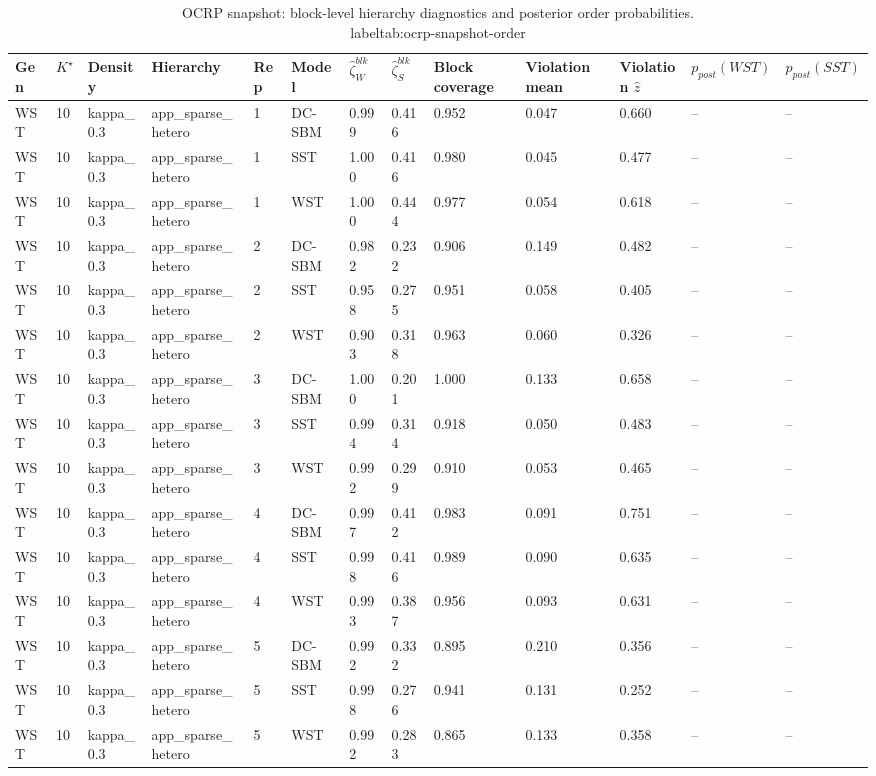 \begin{table}[!h]
\centering
\caption{OCRP snapshot: block-level hierarchy diagnostics and posterior order probabilities.\\label{tab:ocrp-snapshot-order}}
\centering
\begin{tabular}[t]{lllllllllllll}
\toprule
Gen & $K^\star$ & Density & Hierarchy & Rep & Model & $\widehat\zeta_W^{blk}$ & $\widehat\zeta_S^{blk}$ & Block coverage & Violation mean & Violation $\hat z$ & $p_{post}(WST)$ & $p_{post}(SST)$\\
\midrule
WST & 10 & kappa_0.3 & app_sparse_hetero & 1 & DC-SBM & 0.999 & 0.416 & 0.952 & 0.047 & 0.660 & -- & --\\
WST & 10 & kappa_0.3 & app_sparse_hetero & 1 & SST & 1.000 & 0.416 & 0.980 & 0.045 & 0.477 & -- & --\\
WST & 10 & kappa_0.3 & app_sparse_hetero & 1 & WST & 1.000 & 0.444 & 0.977 & 0.054 & 0.618 & -- & --\\
WST & 10 & kappa_0.3 & app_sparse_hetero & 2 & DC-SBM & 0.982 & 0.232 & 0.906 & 0.149 & 0.482 & -- & --\\
WST & 10 & kappa_0.3 & app_sparse_hetero & 2 & SST & 0.958 & 0.275 & 0.951 & 0.058 & 0.405 & -- & --\\
WST & 10 & kappa_0.3 & app_sparse_hetero & 2 & WST & 0.903 & 0.318 & 0.963 & 0.060 & 0.326 & -- & --\\
WST & 10 & kappa_0.3 & app_sparse_hetero & 3 & DC-SBM & 1.000 & 0.201 & 1.000 & 0.133 & 0.658 & -- & --\\
WST & 10 & kappa_0.3 & app_sparse_hetero & 3 & SST & 0.994 & 0.314 & 0.918 & 0.050 & 0.483 & -- & --\\
WST & 10 & kappa_0.3 & app_sparse_hetero & 3 & WST & 0.992 & 0.299 & 0.910 & 0.053 & 0.465 & -- & --\\
WST & 10 & kappa_0.3 & app_sparse_hetero & 4 & DC-SBM & 0.997 & 0.412 & 0.983 & 0.091 & 0.751 & -- & --\\
WST & 10 & kappa_0.3 & app_sparse_hetero & 4 & SST & 0.998 & 0.416 & 0.989 & 0.090 & 0.635 & -- & --\\
WST & 10 & kappa_0.3 & app_sparse_hetero & 4 & WST & 0.993 & 0.387 & 0.956 & 0.093 & 0.631 & -- & --\\
WST & 10 & kappa_0.3 & app_sparse_hetero & 5 & DC-SBM & 0.992 & 0.332 & 0.895 & 0.210 & 0.356 & -- & --\\
WST & 10 & kappa_0.3 & app_sparse_hetero & 5 & SST & 0.998 & 0.276 & 0.941 & 0.131 & 0.252 & -- & --\\
WST & 10 & kappa_0.3 & app_sparse_hetero & 5 & WST & 0.992 & 0.283 & 0.865 & 0.133 & 0.358 & -- & --\\

\end{tabular}
\end{table}
